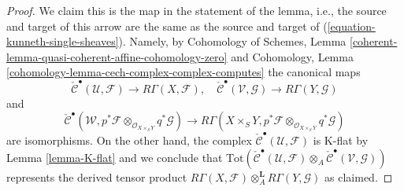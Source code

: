 \begin{proof}
We claim this is the map in the statement of the lemma, i.e.,
the source and target of this arrow are the same as the source
and target of (\ref{equation-kunneth-single-sheaves}). Namely, by
Cohomology of Schemes, Lemma
\ref{coherent-lemma-quasi-coherent-affine-cohomology-zero}
and
Cohomology, Lemma \ref{cohomology-lemma-cech-complex-complex-computes}
the canonical maps
$$
\check{\mathcal{C}}^\bullet(\mathcal{U}, \mathcal{F})
\to
R\Gamma(X, \mathcal{F}),
\quad
\check{\mathcal{C}}^\bullet(\mathcal{V}, \mathcal{G})
\to
R\Gamma(Y, \mathcal{G})
$$
and
$$
\check{\mathcal{C}}^\bullet(\mathcal{W},
p^*\mathcal{F} \otimes_{\mathcal{O}_{X \times_S Y}} q^*\mathcal{G})
\to
R\Gamma(X \times_S Y,
p^*\mathcal{F} \otimes_{\mathcal{O}_{X \times_S Y}}
q^*\mathcal{G})
$$
are isomorphisms. On the other hand, the complex
$\check{\mathcal{C}}^\bullet(\mathcal{U}, \mathcal{F})$
is K-flat by Lemma \ref{lemma-K-flat} and we conclude that
$\text{Tot}(
\check{\mathcal{C}}^\bullet(\mathcal{U}, \mathcal{F})
\otimes_A
\check{\mathcal{C}}^\bullet(\mathcal{V}, \mathcal{G}))$
represents the derived tensor product
$R\Gamma(X, \mathcal{F}) \otimes_A^\mathbf{L} R\Gamma(Y, \mathcal{G})$
as claimed.


\end{proof}
